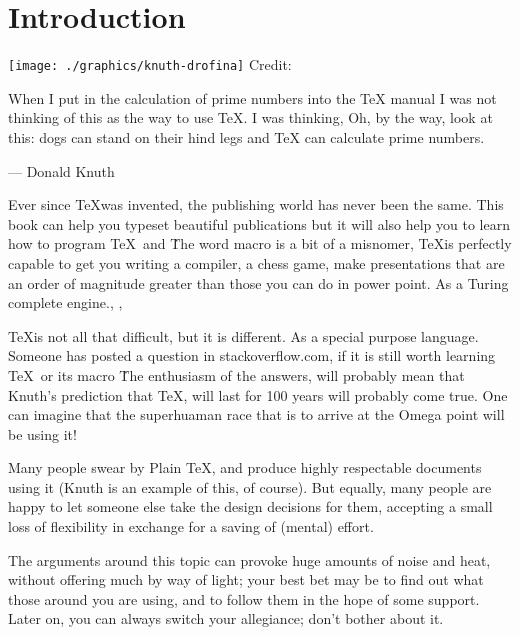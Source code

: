 \chapter{Introduction}
\begin{marginfigure}%
  \texttt{[image: ./graphics/knuth-drofina]}
   {\scriptsize \hfill Credit:}
  \caption{During the eraly days of typography fonts were designed to emulate the looks of calligraphic texts.}
  \label{fig:marginfig1}
\end{marginfigure}

\epigraph{When I put in the calculation of prime numbers  into the TeX manual I was
not thinking of this as the way to use TeX. I was thinking, Oh, by the way,
look at this: dogs can stand on their hind legs and TeX can calculate prime
numbers.}{--- Donald Knuth}

      
Ever since \TeX was invented, the publishing world has never been the same. This book can help you typeset beautiful publications but it will also help you to learn how to program \TeX\ and \latex\. The word macro is a bit of a misnomer, \TeX is perfectly capable to get you writing a compiler, a chess game, make presentations that are an order of magnitude greater than those you can do in power point. As a Turing complete engine.\citep{Bringhurst2005}, \citet{Bringhurst2005}, \citeauthor*{Bringhurst2005}

\TeX is not all that difficult, but it is different. As a special purpose language. Someone has posted a question in 
 stackoverflow.com, if it is still worth learning \TeX\ or its macro \LaTeXe\. The enthusiasm of the answers, will probably mean that Knuth's prediction that \TeX, will last for 100 years will probably come true. One can imagine that the superhuaman race that is to arrive at the Omega point will be using it!\cite{Knuth1990}

Many people swear by Plain TeX, and produce highly respectable documents using it (Knuth is an example of this, of course). But equally, many people are happy to let someone else take the design decisions for them, accepting a small loss of flexibility in exchange for a saving of (mental) effort.

The arguments around this topic can provoke huge amounts of noise and heat, without offering much by way of light; your best bet may be to find out what those around you are using, and to follow them in the hope of some support. Later on, you can always switch your allegiance; don’t bother about it.

